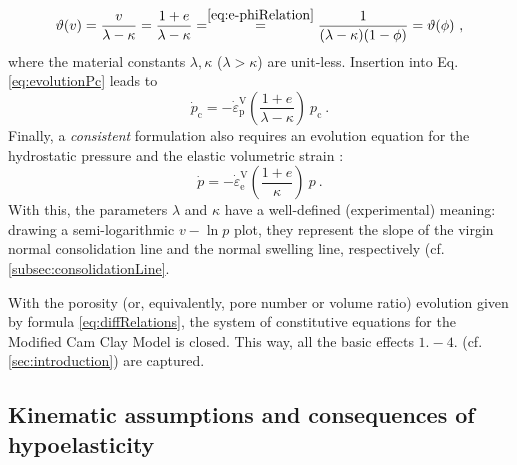 \documentclass[paper=a4, twoside, pagesize]{scrartcl}
\renewcommand{\c}{\text{c}}
\newcommand{\e}{\text{e}}
\newcommand{\p}{\text{p}}
\begin{document}
\begin{equation}
  \vartheta(v) = \frac{v}{\lambda - \kappa} = \frac{1 + e}{\lambda - \kappa} = \overset{\eqref{eq:e-phiRelation}}{=} \frac{1}{(\lambda - \kappa)(1 - \phi)} = \vartheta(\phi) \ ,
\end{equation}
where the material constants $\lambda, \kappa$ ($\lambda>\kappa$) are unit-less. Insertion into Eq. \eqref{eq:evolutionPc} leads to
\begin{equation}\label{eq:evolutionPc_ext}
  \dot{p}_\c = -\dot{\varepsilon}_\p^\text{V} \left(\frac{1+e}{\lambda - \kappa}\right)\ p_\c \ .
\end{equation}
Finally, a \emph{consistent} formulation also requires an evolution equation for the hydrostatic pressure and the elastic volumetric strain \cite{Callari1998}:
\begin{equation}\label{eq:evolutionP}
  \dot{p} = -\dot{\varepsilon}_\e^\text{V} \left(\frac{1+e}{\kappa}\right)\ p \ .
\end{equation}
With this, the parameters $\lambda$ and $\kappa$ have a well-defined (experimental) meaning: drawing a semi-logarithmic $v-\ln p$ plot, they represent the slope of the virgin normal consolidation line and the normal swelling line, respectively (cf. \autoref{subsec:consolidationLine}.
\par
With the porosity (or, equivalently, pore number or volume ratio) evolution given by formula \eqref{eq:diffRelations}, the system of constitutive equations for the Modified Cam Clay Model is closed. This way, all the basic effects $1.-4.$ (cf. \autoref{sec:introduction}) are captured.

\subsection{Kinematic assumptions and consequences of hypoelasticity}\label{subsec:assumptions}
\end{document}

